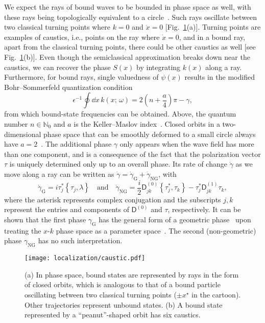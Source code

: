 We expect the rays of bound waves to be bounded in phase space as well, with these rays being topologically equivalent to a circle~\cite{keller1958,mcdonald1988}.
Such rays oscillate between two classical turning points where $k = 0$ and $\dot{x} = 0$ [Fig.~\ref{fig:caustic}(a)].
Turning points are examples of caustics, i.e., points on the ray where $\dot{x} = 0$, and in a bound ray, apart from the classical turning points, there could be other caustics as well [see Fig.~\ref{fig:caustic}(b)].
Even though the semiclassical approximation breaks down near the caustics, we can recover the phase $S(x)$ by integrating $k(x)$ along a ray.
Furthermore, for bound rays, single valuedness of $\psi(x)$ results in the modified Bohr--Sommerfeld quantization condition
%
\begin{equation}
  \epsilon^{-1}\oint \dd{x}\,k(x;\, \omega) = 2\left(n + \frac{a}{4}\right)\pi - \gamma,
  \label{eq:quantization}
\end{equation}
%
from which bound-state frequencies can be obtained.
Above, the quantum number $n \in \mathbb{N}_{0}$ and $a$ is the Keller--Maslov index~\cite{keller1958,maslov1981}.
Closed orbits in a two-dimensional phase space that can be smoothly deformed to a small circle always have $a = 2$~\cite{percival1977}.
The additional phase $\gamma$ only appears when the wave field has more than one component, and is a consequence of the fact that the polarization vector $\tau$ is uniquely determined only up to an overall phase.
Its rate of change $\dot{\gamma}$ as we move along a ray can be written as $\dot{\gamma} = \dot{\gamma}_{\text{G}} + \dot{\gamma}_{\text{NG}}$, with~\cite{yabana1986,kaufman1987,venaille2023}
%
\begin{equation}
\dot{\gamma}_{\text{G}} = i\tau_{j}^{*}\left\{\tau_{j}, \lambda\right\} %
  \quad\text{and}\quad
  \dot{\gamma}_{\text{NG}} = \frac{i}{2}\mathsf{D}^{(0)}_{jk}\left\{\tau^{*}_{j}, \tau_{k}\right\} - \tau_{j}^{*}\mathsf{D}^{(1)}_{jk}\tau_{k},
  \label{eq:extra_phases}
\end{equation}
%
where the asterisk represents complex conjugation and the subscripts $j, k$ represent the entries and components of $\mathsf{D}^{(0)}$ and $\tau$, respectively.
It can be shown that the first phase $\gamma_{\text{G}}$ has the general form of a geometric phase~\cite{pancharatnam1956,berry1984} upon treating the $x$-$k$ phase space as a parameter space~\cite{yabana1986}.
The second (non-geometric) phase $\gamma_{\text{NG}}$ has no such interpretation.
%
\begin{figure}
  \begin{center}
    \texttt{[image: localization/caustic.pdf]}
  \end{center}
  \caption{%
    (a) In phase space, bound states are represented by rays in the form of closed orbits, which is analogous to that of a bound particle oscillating between two classical turning points ($\pm x^{\star}$ in the cartoon).
    Other trajectories represent unbound states.
    (b) A bound state represented by a ``peanut''-shaped orbit has six caustics.%
  }
  \label{fig:caustic}
\end{figure}

\the\textwidth
